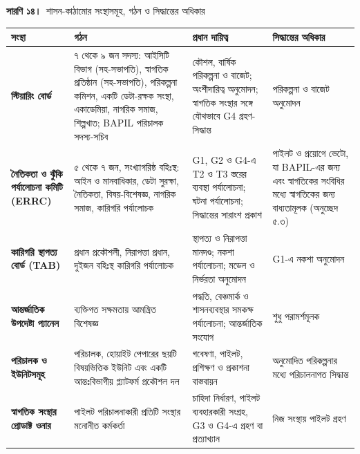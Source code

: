 \documentclass[border=10pt]{standalone}
\begin{document}
\begin{minipage}{17cm}
{\large\bfseries সারণি ১৪।}\ {\large শাসন-কাঠামোর সংস্থাসমূহ, গঠন ও সিদ্ধান্তের অধিকার}\par\vspace{7pt}
\small
{}
\begin{tabularx}{\linewidth}{@{}>{\hsize=0.782\hsize\raggedright\arraybackslash}X>{\hsize=1.195\hsize\raggedright\arraybackslash}X>{\hsize=1.287\hsize\raggedright\arraybackslash}X>{\hsize=0.736\hsize\raggedright\arraybackslash}X@{}}
\arrayrulecolor{bapilrule}\toprule
\rowcolor{white}\textbf{সংস্থা} & \textbf{গঠন} & \textbf{প্রধান দায়িত্ব} & \textbf{সিদ্ধান্তের অধিকার} \\
\midrule
\textbf{স্টিয়ারিং বোর্ড} & ৭ থেকে ৯ জন সদস্য: আইসিটি বিভাগ (সহ-সভাপতি), স্বাগতিক প্রতিষ্ঠান (সহ-সভাপতি), পরিকল্পনা কমিশন, একটি ডেটা-রক্ষক সংস্থা, একাডেমিয়া, নাগরিক সমাজ, শিল্পখাত; BAPIL পরিচালক সদস্য-সচিব & কৌশল, বার্ষিক পরিকল্পনা ও বাজেট; অংশীদারিত্ব অনুমোদন; স্বাগতিক সংস্থার সঙ্গে যৌথভাবে G4 গ্রহণ-সিদ্ধান্ত & পরিকল্পনা ও বাজেট অনুমোদন \\
\textbf{নৈতিকতা ও ঝুঁকি পর্যালোচনা কমিটি (ERRC)} & ৫ থেকে ৭ জন, সংখ্যাগরিষ্ঠ বহিঃস্থ: আইন ও মানবাধিকার, ডেটা সুরক্ষা, নৈতিকতা, বিষয়-বিশেষজ্ঞ, নাগরিক সমাজ, কারিগরি পর্যালোচক & G1, G2 ও G4-এ T2 ও T3 স্তরের ব্যবস্থা পর্যালোচনা; ঘটনা পর্যালোচনা; সিদ্ধান্তের সারাংশ প্রকাশ & পাইলট ও প্রয়োগে ভেটো, যা BAPIL-এর জন্য এবং স্বাগতিকের সংবিধির মধ্যে স্বাগতিকের জন্য বাধ্যতামূলক (অনুচ্ছেদ ৫.৩) \\
\textbf{কারিগরি স্থাপত্য বোর্ড (TAB)} & প্রধান প্রকৌশলী, নিরাপত্তা প্রধান, দুইজন বহিঃস্থ কারিগরি পর্যালোচক & স্থাপত্য ও নিরাপত্তা মানদণ্ড; নকশা পর্যালোচনা; মডেল ও নির্ভরতা অনুমোদন & G1-এ নকশা অনুমোদন \\
\textbf{আন্তর্জাতিক উপদেষ্টা প্যানেল} & ব্যক্তিগত সক্ষমতায় আমন্ত্রিত বিশেষজ্ঞ & পদ্ধতি, বেঞ্চমার্ক ও শাসনব্যবস্থার সমকক্ষ পর্যালোচনা; আন্তর্জাতিক সংযোগ & শুধু পরামর্শমূলক \\
\textbf{পরিচালক ও ইউনিটসমূহ} & পরিচালক, হোয়াইট পেপারের ছয়টি বিষয়ভিত্তিক ইউনিট এবং একটি আন্তঃবিভাগীয় প্ল্যাটফর্ম প্রকৌশল দল & গবেষণা, পাইলট, প্রশিক্ষণ ও প্রকাশনা বাস্তবায়ন & অনুমোদিত পরিকল্পনার মধ্যে পরিচালনাগত সিদ্ধান্ত \\
\textbf{স্বাগতিক সংস্থার প্রোডাক্ট ওনার} & পাইলট পরিচালনাকারী প্রতিটি সংস্থার মনোনীত কর্মকর্তা & চাহিদা নির্ধারণ, পাইলট ব্যবহারকারী সংগ্রহ, G3 ও G4-এ গ্রহণ বা প্রত্যাখ্যান & নিজ সংস্থায় পাইলট গ্রহণ \\
\bottomrule
\end{tabularx}
\par{}
\end{minipage}
\end{document}
